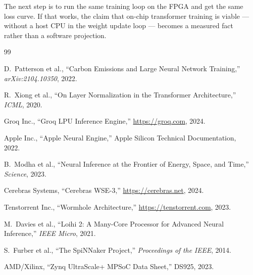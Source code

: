 \documentclass[11pt]{article}
\begin{document}
The next step is to run the same training loop on the FPGA and get the same loss curve.
If that works, the claim that on-chip transformer training is viable --- without a host
CPU in the weight update loop --- becomes a measured fact rather than a software projection.

\begin{thebibliography}{99}

D.~Patterson et al., ``Carbon Emissions and Large Neural Network Training,'' \emph{arXiv:2104.10350}, 2022.

R.~Xiong et al., ``On Layer Normalization in the Transformer Architecture,''
\emph{ICML}, 2020.

Groq Inc., ``Groq LPU Inference Engine,'' \url{https://groq.com}, 2024.

Apple Inc., ``Apple Neural Engine,'' Apple Silicon Technical Documentation, 2022.

B.~Modha et al., ``Neural Inference at the Frontier of Energy, Space, and Time,''
\emph{Science}, 2023.

Cerebras Systems, ``Cerebras WSE-3,'' \url{https://cerebras.net}, 2024.

Tenstorrent Inc., ``Wormhole Architecture,'' \url{https://tenstorrent.com}, 2023.

M.~Davies et al., ``Loihi 2: A Many-Core Processor for Advanced Neural Inference,''
\emph{IEEE Micro}, 2021.

S.~Furber et al., ``The SpiNNaker Project,'' \emph{Proceedings of the IEEE}, 2014.

AMD/Xilinx, ``Zynq UltraScale+ MPSoC Data Sheet,'' DS925, 2023.

\end{thebibliography}
\end{document}
